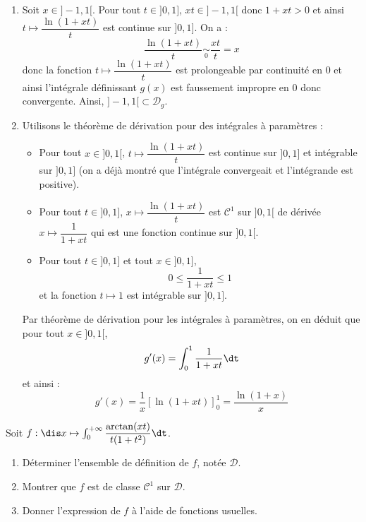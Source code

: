 \documentclass[a4paper,10pt]{report}
\begin{document}
\corr 
\begin{enumerate}
\item Soit $x \in ]-1,1[$. Pour tout $t \in ]0,1]$, $xt \in ]-1,1[$ donc $1+xt >0$ et ainsi $t \mapsto \dfrac{\ln(1+xt)}{t} $ est continue sur $]0,1]$. On a :
$$ \dfrac{\ln(1+xt)}{t}  \underset{0}{\sim} \dfrac{xt}{t}= x$$
donc la fonction $t \mapsto \dfrac{\ln(1+xt)}{t} $ est prolongeable par continuité en $0$ et ainsi l'intégrale définissant $g(x)$ est faussement impropre en $0$ donc convergente. Ainsi, $]-1,1[ \subset \mathcal{D}_g$.

\item Utilisons le théorème de dérivation pour des intégrales à paramètres :
\begin{itemize}
\item Pour tout $x \in ]0,1[$, $t \mapsto \dfrac{\ln(1+xt)}{t}$ est continue sur $]0,1]$ et intégrable sur $]0,1]$ (on a déjà montré que l'intégrale convergeait et l'intégrande est positive).
\item Pour tout $t \in ]0,1]$, $x \mapsto \dfrac{\ln(1+xt)}{t}$ est $\mathcal{C}^1$ sur $]0,1[$ de dérivée $x \mapsto \dfrac{1}{1+xt}$ qui est une fonction continue sur $]0,1[$.
\item Pour tout $t \in ]0,1]$ et tout $x \in ]0,1]$,
$$ 0 \leq \dfrac{1}{1+xt} \leq 1$$
et la fonction $t \mapsto 1$ est intégrable sur $]0,1]$.
\end{itemize}
Par théorème de dérivation pour les intégrales à paramètres, on en déduit que pour tout $x \in ]0,1[$,
$$ g'(x) = \int_{0}^1 \dfrac{1}{1+xt} \dt$$
et ainsi :
$$ g'(x) = \dfrac{1}{x} [ \ln(1+xt) ]_0^1 = \dfrac{\ln(1+x)}{x}$$
\end{enumerate}

\begin{Exa} Soit $f : \dis x \mapsto \int_{0}^{+ \infty} \dfrac{\arctan(xt)}{t(1+t^2)} \dt$.
\begin{enumerate}
\item Déterminer l'ensemble de définition de $f$, notée $\mathcal{D}$.
\item Montrer que $f$ est de classe $\mathcal{C}^1$ sur $\mathcal{D}$.
\item Donner l'expression de $f$ à l'aide de fonctions usuelles.
\end{enumerate}
\end{Exa}
\end{document}
